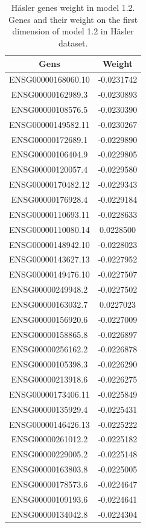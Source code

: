 \documentclass[
  12pt,
  a4paper,
  twoside,
  openright]{book}
\begin{document}
\begin{longtable}[t]{cc}
\caption[Häsler genes weight in model 1.2]{\label{tab:hasler-genes-1-2}Häsler genes weight in model 1.2. Genes and their weight on the first dimension of model 1.2 in Häsler dataset.}\\
\toprule
Gens & Weight\\
\midrule
ENSG00000168060.10 & -0.0231742\\
ENSG00000162989.3 & -0.0230893\\
ENSG00000108576.5 & -0.0230390\\
ENSG00000149582.11 & -0.0230267\\
ENSG00000172689.1 & -0.0229890\\
\addlinespace
ENSG00000106404.9 & -0.0229805\\
ENSG00000120057.4 & -0.0229580\\
ENSG00000170482.12 & -0.0229343\\
ENSG00000176928.4 & -0.0229184\\
ENSG00000110693.11 & -0.0228633\\
\addlinespace
ENSG00000110080.14 & 0.0228500\\
ENSG00000148942.10 & -0.0228023\\
ENSG00000143627.13 & -0.0227952\\
ENSG00000149476.10 & -0.0227507\\
ENSG00000249948.2 & -0.0227502\\
\addlinespace
ENSG00000163032.7 & 0.0227023\\
ENSG00000156920.6 & -0.0227009\\
ENSG00000158865.8 & -0.0226897\\
ENSG00000256162.2 & -0.0226878\\
ENSG00000105398.3 & -0.0226290\\
\addlinespace
ENSG00000213918.6 & -0.0226275\\
ENSG00000173406.11 & -0.0225849\\
ENSG00000135929.4 & -0.0225431\\
ENSG00000146426.13 & -0.0225222\\
ENSG00000261012.2 & -0.0225182\\
\addlinespace
ENSG00000229005.2 & -0.0225148\\
ENSG00000163803.8 & -0.0225005\\
ENSG00000178573.6 & -0.0224647\\
ENSG00000109193.6 & -0.0224641\\
ENSG00000134042.8 & -0.0224304\\
\bottomrule
\end{longtable}
\end{document}
